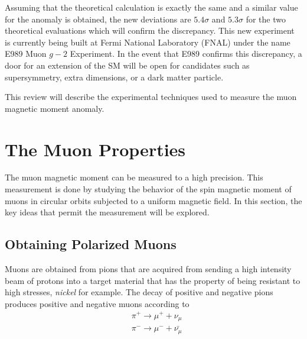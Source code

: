 \documentclass{outhesis}
\begin{document}
Assuming that the theoretical calculation is exactly the same and a similar value for the anomaly is obtained, the new deviations are $5.4\sigma$ and $5.3\sigma$ for the two theoretical evaluations which will confirm the discrepancy. This new experiment is currently being built at Fermi National Laboratory (FNAL) under the name E989 Muon $g-2$ Experiment. 
In the event that E989 confirms this discrepancy, a door for an extension of the SM will be open for candidates such as supersymmetry, extra dimensions, or a dark matter particle. 

This review will describe the experimental techniques used to measure the muon magnetic moment anomaly.  


\section{The Muon Properties}

The muon magnetic moment can be measured to a high precision. This measurement is done by studying the behavior of the spin magnetic moment of muons in circular orbits subjected to a uniform magnetic field. In this section, the key ideas that permit the measurement will be explored. 



\subsection{Obtaining Polarized Muons}

Muons are obtained from pions that are acquired from sending a high intensity beam of protons into a target material that has the property of being resistant to high stresses, \emph{nickel} for example. The decay of positive and negative pions produces positive and negative muons according to 
\begin{equation}
\begin{split}
&\pi^+ \rightarrow \mu^+ + \nu_{\mu}\\
&\pi^- \rightarrow \mu^- + \bar{\nu_{\mu}}
\end{split}
\end{equation}
\end{document}
